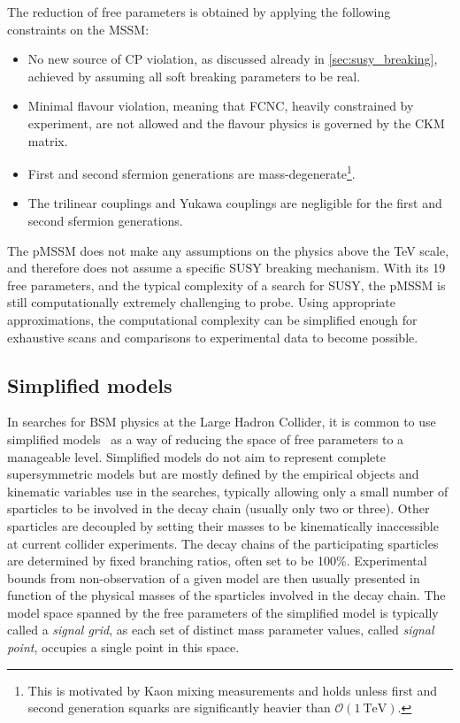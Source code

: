 The reduction of free parameters is obtained by applying the following constraints on the MSSM:
\begin{itemize}
	\item No new source of CP violation, as discussed already in \cref{sec:susy_breaking}, achieved by assuming all soft breaking parameters to be real.
	\item Minimal flavour violation, meaning that FCNC, heavily constrained by experiment, are not allowed and the flavour physics is governed by the CKM matrix.
	\item First and second sfermion generations are mass-degenerate\footnote{This is motivated by \eg Kaon mixing measurements and holds unless first and second generation squarks are significantly heavier than $\mathcal{O}(\SI{1}{\TeV})$.}.
	\item The trilinear couplings and Yukawa couplings are negligible for the first and second sfermion generations.
\end{itemize}
The pMSSM does not make any assumptions on the physics above the TeV scale, and therefore does not assume a specific SUSY breaking mechanism. With its 19 free parameters, and the typical complexity of a search for SUSY, the pMSSM is still computationally extremely challenging to probe. Using appropriate approximations, the computational complexity can be simplified enough for exhaustive scans and comparisons to experimental data to become possible. 

\subsection{Simplified models}

In searches for BSM physics at the Large Hadron Collider, it is common to use simplified models~\cite{SimplifiedModels1:2008ag,SimplifiedModels2:2011wf,Alves:2011sq} as a way of reducing the space of free parameters to a manageable level. Simplified models do not aim to represent complete supersymmetric models but are mostly defined by the empirical objects and kinematic variables use in the searches, typically allowing only a small number of sparticles to be involved in the decay chain (usually only two or three). Other sparticles are decoupled by setting their masses to be kinematically inaccessible at current collider experiments. The decay chains of the participating sparticles are determined by fixed branching ratios, often set to be 100\%. Experimental bounds from non-observation of a given model are then usually presented in function of the physical masses of the sparticles involved in the decay chain. The model space spanned by the free parameters of the simplified model is typically called a \textit{signal grid}, as each set of distinct mass parameter values, called \textit{signal point}, occupies a single point in this space.

